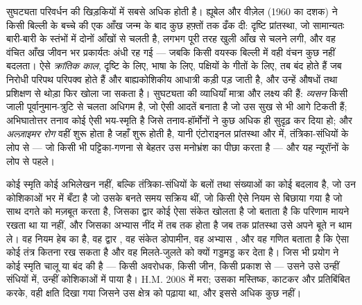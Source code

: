 \begin{definition}[क्रांतिक काल और सुघट्यता के रोग]\label{def:b3:learning-memory:critical}
सुघट्यता परिवर्धन की खिड़कियों में सबसे अधिक होती है। ह्यूबेल और
वीज़ेल (1960 का दशक) ने किसी बिल्ली के बच्चे की एक आँख जन्म के बाद कुछ
हफ़्तों तक ढँक दी: दृष्टि प्रांतस्था, जो सामान्यतः बारी-बारी के स्तंभों
में दोनों आँखों से चलती है, लगभग पूरी तरह खुली आँख से चलने लगी, और वह
वंचित आँख जीवन भर प्रकार्यतः अंधी रह गई --- जबकि किसी वयस्क बिल्ली में
वही वंचन कुछ नहीं बदलता। ऐसे \emph{क्रांतिक काल}, दृष्टि के लिए, भाषा
के लिए, पक्षियों के गीतों के लिए, तब बंद होते हैं जब निरोधी परिपथ
परिपक्व होते हैं और बाह्यकोशिकीय आधात्री कड़ी पड़ जाती है, और उन्हें
औषधों तथा प्रशिक्षण से थोड़ा फिर खोला जा सकता है। सुघट्यता की व्याधियाँ
मात्रा और लक्ष्य की हैं: \emph{व्यसन} किसी जाली पूर्वानुमान-त्रुटि से
चलता अधिगम है, जो ऐसी आदतें बनाता है जो उस सुख से भी आगे टिकती हैं;
अभिघातोत्तर तनाव कोई ऐसी भय-स्मृति है जिसे तनाव-हॉर्मोनों ने कुछ अधिक
ही सुदृढ़ कर दिया हो; और \emph{अल्ज़ाइमर रोग} वहीं शुरू होता है जहाँ
 शुरू होती है, यानी एंटोराइनल प्रांतस्था और
 में, तंत्रिका-संधियों के लोप से --- जो किसी भी पट्टिका-गणना
से बेहतर उस मनोभ्रंश का पीछा करता है --- और यह न्यूरॉनों के लोप से पहले।
\end{definition}

\begin{remark}[स्मृति किस चीज़ की बनी है]\label{rem:b3:learning-memory:what}
कोई स्मृति कोई अभिलेखन नहीं, बल्कि तंत्रिका-संधियों के बलों तथा
संख्याओं का कोई बदलाव है, जो उन कोशिकाओं भर में बँटा है जो उसके बनते
समय सक्रिय थीं, जो किसी ऐसे नियम से बिछाया गया है जो साथ दगते को
मज़बूत करता है, जिसका द्वार कोई ऐसा संकेत खोलता है जो बताता है कि
परिणाम मायने रखता था या नहीं, और जिसका अभ्यास नींद में तब तक होता है जब
तक प्रांतस्था उसे अपने बूते न थाम ले। वह नियम हेब का है, वह द्वार , वह संकेत डोपामीन, वह अभ्यास , और वह गणित बताता है कि
ऐसा कोई तंत्र कितना रख सकता है और वह मिलते-जुलते को क्यों गड्डमड्ड कर
देता है। जिस भी प्रयोग ने कोई स्मृति चालू या बंद की है --- किसी
अवरोधक, किसी जीन, किसी प्रकाश से --- उसने उसे उन्हीं संधियों में, उन्हीं
कोशिकाओं में पाया है। H.M. 2008 में मरा; उसका मस्तिष्क, काटकर और
प्रतिबिंबित करके, वही क्षति दिखा गया जिसने उस क्षेत्र को पढ़ाया था, और
इससे अधिक कुछ नहीं।
\end{remark}

